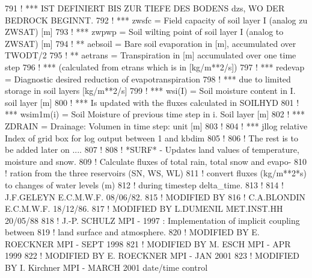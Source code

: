 \begin{DoxyCode}
791 \textcolor{comment}{!     ***          IST DEFINIERT BIS ZUR TIEFE DES BODENS dzs, WO DER BEDROCK BEGINNT.}
792 \textcolor{comment}{!     ***  zwsfc = Field capacity of soil layer I (analog zu ZWSAT) [m]}
793 \textcolor{comment}{!     ***  zwpwp = Soil wilting point of soil layer I (analog to ZWSAT) [m]}
794 \textcolor{comment}{!     ** aebsoil = Bare soil evaporation in [m], accumulated over TWODT/2}
795 \textcolor{comment}{!     ** aetrans = Transpiration in [m] accumulated over one time step}
796 \textcolor{comment}{!     ***          (calculated from etrans which is in [kg/m**2/s])}
797 \textcolor{comment}{!     *** redevap  = Diagnostic desired reduction of evapotranspiration}
798 \textcolor{comment}{!     ***            due to limited storage in soil layers [kg/m**2/s]}
799 \textcolor{comment}{!     *** wsi(I) = Soil moisture content in I. soil layer [m]}
800 \textcolor{comment}{!     ***          Is updated with the fluxes calculated in SOILHYD}
801 \textcolor{comment}{!     *** wsim1m(i) = Soil Moisture of previous time step in i. Soil layer [m]}
802 \textcolor{comment}{!     *** ZDRAIN = Drainage: Volumen in time step: unit [m]}
803 \textcolor{comment}{!}
804 \textcolor{comment}{!     *** jllog          relative Index of grid box for log output between 1 and kbdim}
805 \textcolor{comment}{!}
806 \textcolor{comment}{!       The rest is to be added later on ....}
807 \textcolor{comment}{!}
808 \textcolor{comment}{!     *SURF* - Updates land values of temperature, moisture and snow.}
809 \textcolor{comment}{!              Calculate fluxes of total rain, total snow and evapo-}
810 \textcolor{comment}{!              ration from the three reservoirs (SN, WS, WL)}
811 \textcolor{comment}{!              convert fluxes (kg/m**2*s) to changes of water levels (m)}
812 \textcolor{comment}{!              during timestep delta\_time.}
813 \textcolor{comment}{!}
814 \textcolor{comment}{!     J.F.GELEYN     E.C.M.W.F.     08/06/82.}
815 \textcolor{comment}{!     MODIFIED BY}
816 \textcolor{comment}{!     C.A.BLONDIN    E.C.M.W.F.    18/12/86.}
817 \textcolor{comment}{!     MODIFIED BY L.DUMENIL      MET.INST.HH     20/05/88}
818 \textcolor{comment}{!                 J.-P. SCHULZ   MPI - 1997 : Implementation of implicit coupling between}
819 \textcolor{comment}{!                                             land surface and atmosphere.}
820 \textcolor{comment}{!     MODIFIED BY E. ROECKNER    MPI - SEPT 1998}
821 \textcolor{comment}{!     MODIFIED BY M. ESCH        MPI - APR  1999}
822 \textcolor{comment}{!     MODIFIED BY E. ROECKNER    MPI - JAN  2001}
823 \textcolor{comment}{!     MODIFIED BY I. Kirchner    MPI - MARCH 2001 date/time control}

\end{DoxyCode}
